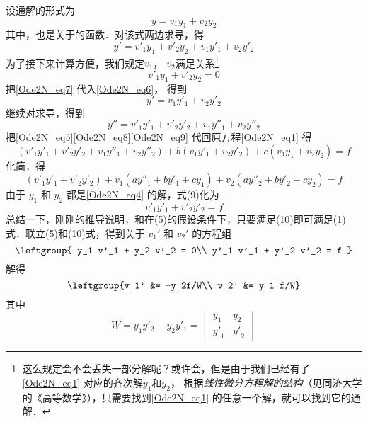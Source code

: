 设通解的形式为
\begin{equation}\label{Ode2N_eq5}
y = v_1 y_1 + v_2 y_2
\end{equation}
其中，也是关于的函数．对该式两边求导，得
\begin{equation}\label{Ode2N_eq6}
y' = v'_1 y_1 + v'_2 y_2 + v_1 y'_1 + v_2 y'_2
\end{equation}
为了接下来计算方便，我们规定$v_1$，  $v_2$满足关系\footnote{这么规定会不会丢失一部分解呢？或许会，但是由于我们已经有了\autoref{Ode2N_eq1} 对应的齐次解$y_1$和$y_2$， 根据\emph{线性微分方程解的结构}（见同济大学的《高等数学》），只需要找到\autoref{Ode2N_eq1} 的任意一个解，就可以找到它的通解．}
\begin{equation}\label{Ode2N_eq7}
v'_1 y_1 + v'_2 y_2 = 0
\end{equation}
把\autoref{Ode2N_eq7} 代入\autoref{Ode2N_eq6}， 得到
\begin{equation}\label{Ode2N_eq8}
y' = v_1 y'_1 + v_2 y'_2
\end{equation}
继续对求导，得到
\begin{equation}\label{Ode2N_eq9}
y'' = {v'_1}{y'_1} + {v'_2}{y'_2} + {v_1}{y''_1} + {v_2}{y''_2}
\end{equation}
把\autoref{Ode2N_eq5}\autoref{Ode2N_eq8}\autoref{Ode2N_eq9} 代回原方程\autoref{Ode2N_eq1} 得
\begin{equation}
(v'_1 y'_1 + v'_2 y'_2 + v_1 y''_1 + v_2 y''_2) + b (v_1 y'_1 + v_2 y'_2) + c(v_1 y_1 + v_2 y_2) = f
\end{equation}
化简，得
\begin{equation}
(v'_1 y'_1 + v'_2 y'_2) + v_1 (a y''_1 + b y'_1 + c y_1) + v_2 (a y''_2 + b y'_2 + c y_2) = f \end{equation}
由于 $y_1$ 和 $y_2$ 都是\autoref{Ode2N_eq4} 的解，式(9)化为 %
\begin{equation} {v'_1}{y'_1} + {v'_2}{y'_2} = f
\end{equation}
总结一下，刚刚的推导说明，和在(5)的假设条件下，只要满足(10)即可满足(1)式．联立(5)和(10)式，得到关于 $v_1'$ 和 $v_2'$ 的方程组
\begin{equation}
\leftgroup{
y_1 v'_1 + y_2 v'_2 = 0\\
y'_1 v'_1 + y'_2 v'_2 = f
}\end{equation}
解得
\begin{equation}
\leftgroup{v_1' &= -y_2f/W\\
v_2' &= y_1 f/W}
\end{equation}
其中
\begin{equation}
W = {y_1}{y'_2} - {y_2}{y'_1} = 
\begin{vmatrix}
{y_1}&{y_2}\\
{{y'}_1}&{{y'}_2}
\end{vmatrix}
\end{equation}
